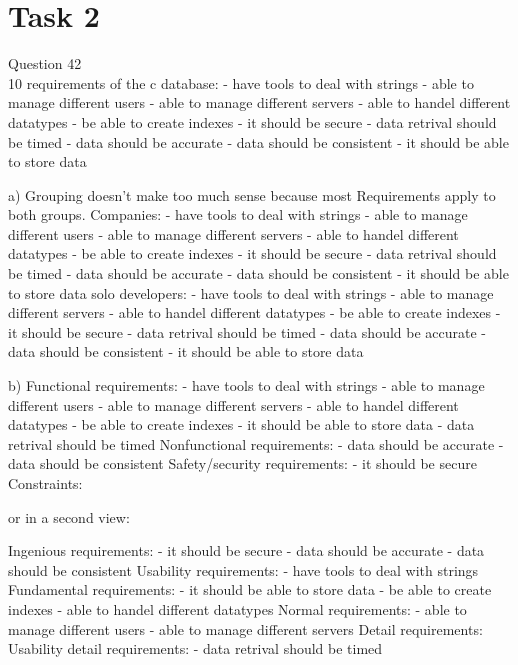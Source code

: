\chapter{Task 2}
Question 42 \\
10 requirements of the c database:
- have tools to deal with strings
- able to manage different users
- able to manage different servers
- able to handel different datatypes
- be able to create indexes
- it should be secure
- data retrival should be timed
- data should be accurate
- data should be consistent
- it should be able to store data

a)
Grouping doesn't make too much sense because most Requirements apply to both groups.
Companies:
- have tools to deal with strings
- able to manage different users
- able to manage different servers
- able to handel different datatypes
- be able to create indexes
- it should be secure
- data retrival should be timed
- data should be accurate
- data should be consistent
- it should be able to store data
solo developers:
- have tools to deal with strings
- able to manage different servers
- able to handel different datatypes
- be able to create indexes
- it should be secure
- data retrival should be timed
- data should be accurate
- data should be consistent
- it should be able to store data

b)
Functional requirements:
- have tools to deal with strings
- able to manage different users
- able to manage different servers
- able to handel different datatypes
- be able to create indexes
- it should be able to store data
- data retrival should be timed
Nonfunctional requirements:
- data should be accurate
- data should be consistent
Safety/security requirements:
- it should be secure
Constraints:

or in a second view:

Ingenious requirements:
- it should be secure
- data should be accurate
- data should be consistent
Usability requirements:
- have tools to deal with strings
Fundamental requirements:
- it should be able to store data
- be able to create indexes
- able to handel different datatypes
 Normal requirements:
- able to manage different users
- able to manage different servers
 Detail requirements:
 Usability detail requirements:
  - data retrival should be timed
  
